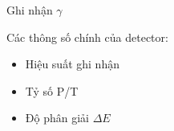 \begin{frame}[label = ghinhan]{Ghi nhận $\gamma$}

Các thông số chính của detector:

\begin{itemize}
	\item <2->\alert<2-2>{Hiệu suất ghi nhận}
	\item <3->\alert<3-3>{Tỷ số P/T}
	\item <4->\alert<4-4>{Độ phân giải $\Delta E$}
\end{itemize}


\end{frame}